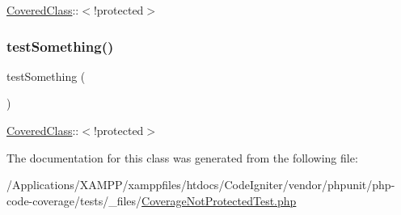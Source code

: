 \mbox{\hyperlink{class_covered_class}{Covered\+Class}}\+:\+:$<$!protected$>$ \mbox{\label{class_coverage_not_protected_test_a0fc4e17369bc9607ebdd850d9eda8167}} 
\subsubsection{\texorpdfstring{test\+Something()}{testSomething()}\hspace{0.1cm}{\footnotesize\ttfamily [2/2]}}
{\footnotesize\ttfamily test\+Something (\begin{DoxyParamCaption}{ }\end{DoxyParamCaption})}

\mbox{\hyperlink{class_covered_class}{Covered\+Class}}\+:\+:$<$!protected$>$ 

The documentation for this class was generated from the following file\+:\begin{DoxyCompactItemize}
\item 
/\+Applications/\+X\+A\+M\+P\+P/xamppfiles/htdocs/\+Code\+Igniter/vendor/phpunit/php-\/code-\/coverage/tests/\+\_\+files/\mbox{\hyperlink{php-code-coverage_2tests_2__files_2_coverage_not_protected_test_8php}{Coverage\+Not\+Protected\+Test.\+php}}\end{DoxyCompactItemize}
